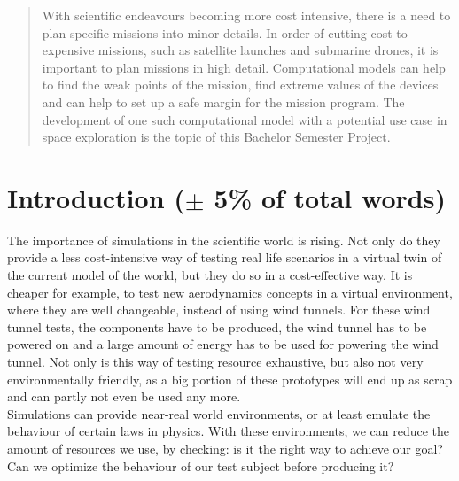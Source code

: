\documentclass[conference,compsoc]{IEEEtran}
\begin{document}




\maketitle


\begin{abstract}
With scientific endeavours becoming more cost intensive, there is a need to plan specific missions into minor details. In order of cutting cost to expensive missions, such as satellite launches and submarine drones, it is important to plan missions in high detail. Computational models can help to find the weak points of the mission, find extreme values of the devices and can help to set up a safe margin for the mission program. The development of one such computational model with a potential use case in space exploration is the topic of this Bachelor Semester Project.
\end{abstract}


%
\IEEEpeerreviewmaketitle


\section{Introduction ($\pm$ 5\% of total words)}
The importance of simulations in the scientific world is rising. Not only do they provide a less cost-intensive way of testing real life scenarios in a virtual twin of the current model of the world, but they do so in a cost-effective way. It is cheaper for example, to test new aerodynamics concepts in a virtual environment, where they are well changeable, instead of using wind tunnels. For these wind tunnel tests, the components have to be produced, the wind tunnel has to be powered on and a large amount of energy has to be used for powering the wind tunnel. Not only is this way of testing resource exhaustive, but also not very environmentally friendly, as a big portion of these prototypes will end up as scrap and can partly not even be used any more.  \\
Simulations can provide near-real world environments, or at least emulate the behaviour of certain laws in physics. With these environments, we can reduce the amount of resources we use, by checking: is it the right way to achieve our goal? Can we optimize the behaviour of our test subject before producing it? 
\end{document}

